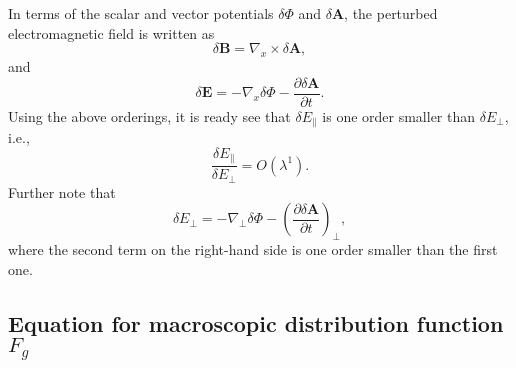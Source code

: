 \documentclass{article}
\begin{document}
In terms of the scalar and vector potentials $\delta \Phi$ and $\delta
\mathbf{A}$, the perturbed electromagnetic field is written as
\begin{equation}
  \delta \mathbf{B}= \nabla_x \times \delta \mathbf{A},
\end{equation}
and
\begin{equation}
  \label{18-3-6-a7} \delta \mathbf{E}= - \nabla_x \delta \Phi - \frac{\partial
  \delta \mathbf{A}}{\partial t} .
\end{equation}
Using the above orderings, it is ready see that $\delta E_{\parallel}$ is one
order smaller than $\delta E_{\perp}$, i.e.,
\begin{equation}
  \frac{\delta E_{\parallel}}{\delta E_{\perp}} = O (\lambda^1) .
\end{equation}
Further note that
\begin{equation}
  \delta E_{\perp} = - \nabla_{\perp} \delta \Phi - \left( \frac{\partial
  \delta \mathbf{A}}{\partial t} \right)_{\perp},
\end{equation}
where the second term on the right-hand side is one order smaller than the
first one.

\subsection{Equation for macroscopic distribution function $F_g$}
\end{document}
